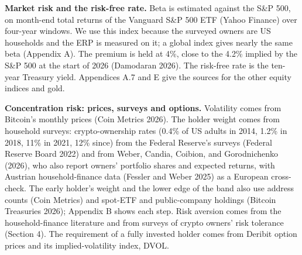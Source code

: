 \documentclass[11pt]{article}
\begin{document}
\textbf{Market risk and the risk-free rate.} Beta is estimated against the S\&P 500, on month-end total returns of the Vanguard S\&P 500 ETF (Yahoo Finance) over four-year windows. We use this index because the surveyed owners are US households and the ERP is measured on it; a global index gives nearly the same beta (Appendix A). The premium is held at 4\%, close to the 4.2\% implied by the S\&P 500 at the start of 2026 (Damodaran 2026). The risk-free rate is the ten-year Treasury yield. Appendices A.7 and E give the sources for the other equity indices and gold.

\textbf{Concentration risk: prices, surveys and options.} Volatility comes from Bitcoin's monthly prices (Coin Metrics 2026). The holder weight comes from household surveys: crypto-ownership rates (0.4\% of US adults in 2014, 1.2\% in 2018, 11\% in 2021, 12\% since) from the Federal Reserve's surveys (Federal Reserve Board 2022) and from Weber, Candia, Coibion, and Gorodnichenko (2026), who also report owners' portfolio shares and expected returns, with Austrian household-finance data (Fessler and Weber 2025) as a European cross-check. The early holder's weight and the lower edge of the band also use address counts (Coin Metrics) and spot-ETF and public-company holdings (Bitcoin Treasuries 2026); Appendix B shows each step. Risk aversion comes from the household-finance literature and from surveys of crypto owners' risk tolerance (Section 4). The requirement of a fully invested holder comes from Deribit option prices and its implied-volatility index, DVOL.
\end{document}
